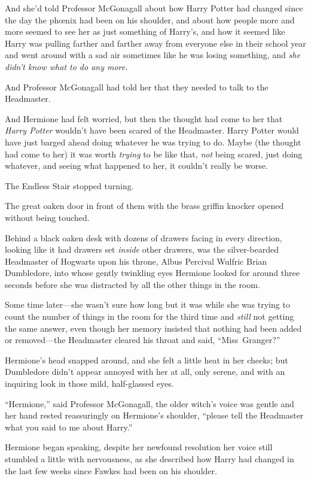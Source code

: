 And she’d told Professor McGonagall about how Harry Potter had changed since the day the phœnix had been on his shoulder, and about how people more and more seemed to see her as just something of Harry’s, and how it seemed like Harry was pulling farther and farther away from everyone else in their school year and went around with a sad air sometimes like he was losing something, and \emph{she didn’t know what to do any more.}

And Professor McGonagall had told her that they needed to talk to the Headmaster.

And Hermione had felt worried, but then the thought had come to her that \emph{Harry Potter} wouldn’t have been scared of the Headmaster. Harry Potter would have just barged ahead doing whatever he was trying to do. Maybe (the thought had come to her) it was worth \emph{trying} to be like that, \emph{not} being scared, just doing whatever, and seeing what happened to her, it couldn’t really be worse.

The Endless Stair stopped turning.

The great oaken door in front of them with the brass griffin knocker opened without being touched.

Behind a black oaken desk with dozens of drawers facing in every direction, looking like it had drawers set \emph{inside} other drawers, was the silver-bearded Headmaster of Hogwarts upon his throne, Albus Percival Wulfric Brian Dumbledore, into whose gently twinkling eyes Hermione looked for around three seconds before she was distracted by all the other things in the room.

Some time later—she wasn’t sure how long but it was while she was trying to count the number of things in the room for the third time and \emph{still} not getting the same answer, even though her memory insisted that nothing had been added or removed—the Headmaster cleared his throat and said, “Miss~Granger?”

Hermione’s head snapped around, and she felt a little heat in her cheeks; but Dumbledore didn’t appear annoyed with her at all, only serene, and with an inquiring look in those mild, half-glassed eyes.

“Hermione,” said Professor McGonagall, the older witch’s voice was gentle and her hand rested reassuringly on Hermione’s shoulder, “please tell the Headmaster what you said to me about Harry.”

Hermione began speaking, despite her newfound resolution her voice still stumbled a little with nervousness, as she described how Harry had changed in the last few weeks since Fawkes had been on his shoulder.

